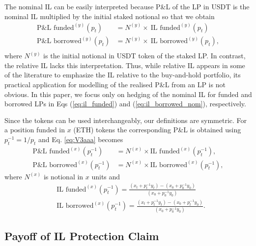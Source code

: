 \documentclass[pdftex,11pt,a4paper] {article}
\begin{document}
The nominal IL can be easily interpreted because P\&L of the LP in USDT is
the nominal IL multiplied by the initial staked notional so that we obtain
\begin{equation}  \label{eq:V3aaa}
\begin{split}
\text{P\&L funded}^{(y)}(p_{t}) & = N^{(y)} \times \ \text{IL funded}^{(y)}(p_{t}) \\
\text{P\&L borrowed}^{(y)}(p_{t}) & = N^{(y)} \times \ \text{IL borrowed}^{(y)}(p_{t}),
\\
\end{split}%
\end{equation}
where $N^{(y)}$ is the initial notional in USDT token of the staked LP. In
contrast, the relative IL lacks this interpretation. Thus, while relative IL
appears in some of the literature to emphasize the IL relative to the
buy-and-hold portfolio, its practical application for modelling of the
realised P\&L from an LP is not obvious. In this paper, we focus only on
hedging of the nominal IL for funded and borrowed LPs in Eqs (\ref{eq:il_funded}) and (\ref{eq:il_borrowed_nom}), respectively.

Since the tokens can be used interchangeably, our definitions are symmetric.
For a position funded in $x$ (ETH) tokens the corresponding P\&L is obtained
using $p^{-1}_{t}=1/p_{t}$ and Eq. \eqref{eq:V3aaa} becomes
\begin{equation}  \label{eq:V3x}
\begin{split}
\text{P\&L funded}^{(x)}(p^{-1}_{t}) & = N^{(x)} \times \text{IL funded}^{(x)}(p^{-1}_{t}), \\
\text{P\&L borrowed}^{(x)}(p^{-1}_{t}) & = N^{(x)} \times \text{IL borrowed}^{(x)}(p^{-1}_{t}),
\end{split}%
\end{equation}
where $N^{(x)}$ is notional in $x$ units and
\begin{equation}  \label{eq:il_funded_x}
\begin{split}
&\text{IL funded}^{(x)}(p^{-1}_{t}) = \frac{\left(x_{t} +
p^{-1}_{t}y_{t}\right)-\left(x_{0} + p^{-1}_{0}y_{0}\right)}{\left(x_{0} +
p^{-1}_{0}y_{0}\right)} \\
& \text{IL borrowed}^{(x)}(p^{-1}_{t}) = \frac{\left(x_{t} + p^{-1}_{t}y_{t}
\right) - \left(x_{0} + p^{-1}_{t}y_{0}\right)}{\left(x_{0} +
p^{-1}_{0}y_{0}\right)}.
\end{split}%
\end{equation}

\subsection{Payoff of IL Protection Claim}
\end{document}
